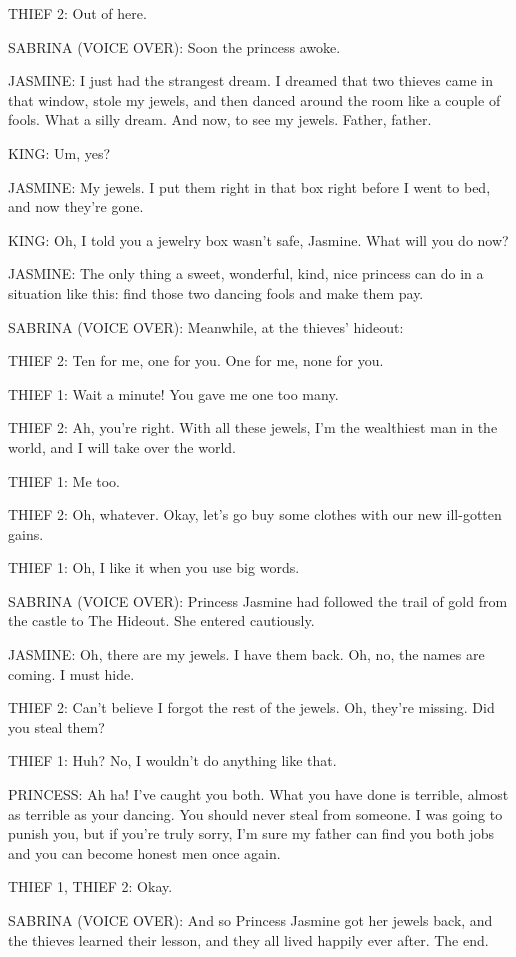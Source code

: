 THIEF 2:
Out of here.

SABRINA (VOICE OVER):
Soon the princess awoke.

JASMINE:
I just had the strangest dream.
I dreamed that two thieves came in that window, stole my jewels, and then danced around the room like a couple of fools.
What a silly dream.
And now, to see my jewels.
Father, father.

KING:
Um, yes?

JASMINE:
My jewels.
I put them right in that box right before I went to bed, and now they're gone.

KING:
Oh, I told you a jewelry box wasn't safe, Jasmine.
What will you do now?

JASMINE:
The only thing a sweet, wonderful, kind, nice princess can do in a situation like this: find those two dancing fools and make them pay.

SABRINA (VOICE OVER):
Meanwhile, at the thieves' hideout:

THIEF 2:
Ten for me, one for you.
One for me, none for you.

THIEF 1:
Wait a minute!
You gave me one too many.

THIEF 2:
Ah, you're right.
With all these jewels, I'm the wealthiest man in the world, and I will take over the world.

THIEF 1:
Me too.

THIEF 2:
Oh, whatever.
Okay, let's go buy some clothes with our new ill-gotten gains.

THIEF 1:
Oh, I like it when you use big words.

SABRINA (VOICE OVER):
Princess Jasmine had followed the trail of gold from the castle to The Hideout.
She entered cautiously.

JASMINE:
Oh, there are my jewels.
I have them back.
Oh, no, the names are coming.
I must hide.

THIEF 2:
Can't believe I forgot the rest of the jewels.
Oh, they're missing.
Did you steal them?

THIEF 1:
Huh? No, I wouldn't do anything like that.

PRINCESS:
Ah ha! I've caught you both.
What you have done is terrible, almost as terrible as your dancing.
You should never steal from someone.
I was going to punish you, but if you're truly sorry, I'm sure my father can find you both jobs and you can become honest men once again.

THIEF 1, THIEF 2:
Okay.

SABRINA (VOICE OVER):
And so Princess Jasmine got her jewels back, and the thieves learned their lesson, and they all lived happily ever after.
The end.

